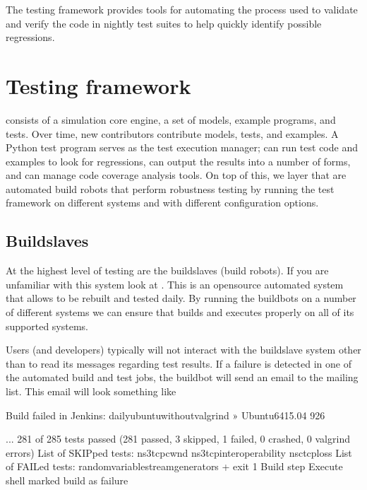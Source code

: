 \documentclass[letterpaper,10pt,english]{sphinxmanual}
\renewcommand{\sphinxcode}[1]{\texttt{\small{#1}}}
\begin{document}
The  testing framework provides tools for automating the process
used to validate and verify the code in nightly test suites to help quickly
identify possible regressions.


\section{Testing framework}
\label{\detokenize{test-framework:testing-framework}}\label{\detokenize{test-framework::doc}}
 consists of a simulation core engine, a set of models, example programs,
and tests.  Over time, new contributors contribute models, tests, and
examples.  A Python test program \sphinxcode{} serves as the test
execution manager; \sphinxcode{} can run test code and examples to
look for regressions, can output the results into a number of forms, and
can manage code coverage analysis tools.  On top of this, we layer
 that are automated build robots that perform
robustness testing by running the test framework on different systems
and with different configuration options.


\subsection{Buildslaves}
\label{\detokenize{test-framework:buildslaves}}
At the highest level of  testing are the buildslaves (build robots).
If you are unfamiliar with
this system look at .
This is an open\sphinxhyphen{}source automated system that allows  to be rebuilt
and tested daily.  By running the buildbots on a number
of different systems we can ensure that  builds and executes
properly on all of its supported systems.

Users (and developers) typically will not interact with the buildslave system other
than to read its messages regarding test results.  If a failure is detected in
one of the automated build and test jobs, the buildbot will send an email to the
 mailing list.  This email will look something like

\begin{sphinxVerbatim} Build failed in Jenkins: daily\PYGZhy{}ubuntu\PYGZhy{}without\PYGZhy{}valgrind » Ubuntu\PYGZhy{}64\PYGZhy{}15.04 \PYGZsh{}926

...
281 of 285 tests passed (281 passed, 3 skipped, 1 failed, 0 crashed, 0 valgrind errors)
List of SKIPped tests:
  ns3\PYGZhy{}tcp\PYGZhy{}cwnd
  ns3\PYGZhy{}tcp\PYGZhy{}interoperability
  nsc\PYGZhy{}tcp\PYGZhy{}loss
List of FAILed tests:
  random\PYGZhy{}variable\PYGZhy{}stream\PYGZhy{}generators
+ exit 1
Build step \PYGZsq{}Execute shell\PYGZsq{} marked build as failure
\end{sphinxVerbatim}
\end{document}
